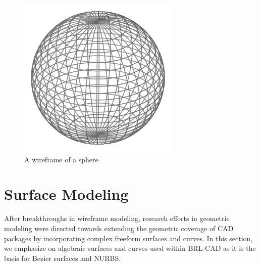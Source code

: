
\begin{figure}[htbp]
\centering
\includegraphics[trim=0.1cm 0.3cm 0.5cm 0.5cm, clip=true, totalheight=0.5\textheight]{Figures/Sphere.png}
\caption[A wireframe of a sphere]{A wireframe of a sphere}
\label{Sphere}
\end{figure}



\section{Surface Modeling}

After breakthroughs in wireframe modeling, research efforts in geometric modeling were directed 
towards extending the geometric coverage of CAD packages by incorporating complex free­form surfaces
 and curves. In this section, we emphasize on algebraic surfaces and curves used within BRL­-CAD 
as it is the basis for Bezier surfaces and NURBS.


